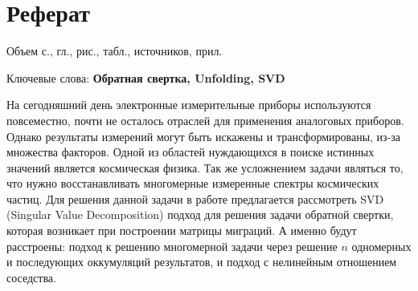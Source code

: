 \documentclass[a4paper,12pt]{diplom}
\begin{document}













\maketitle
\chapter{Реферат}

Объем  с.,  гл.,  рис.,
 табл.,  источников,  прил.

\medskip

Ключевые слова: \textbf{Обратная свертка, Unfolding, SVD}

\medskip

На сегодняшний день электронные измерительные приборы используются повсеместно, почти не осталось отраслей для применения аналоговых приборов. 
Однако результаты измерений могут быть искажены и трансформированы, из-за множества факторов. Одной из областей нуждающихся в поиске истинных 
значений является космическая физика. Так же усложнением задачи являться то, что нужно восстанавливать многомерные измеренные спектры 
космических частиц. Для решения данной задачи в работе предлагается рассмотреть SVD (Singular Value Decomposition) подход для решения задачи 
обратной свертки, которая возникает при построении матрицы миграций. А именно будут расстроены: подход к решению многомерной задачи через 
решение $n$ одномерных и последующих оккумуляций результатов, и подход с нелинейным отношением соседства.
\end{document}
